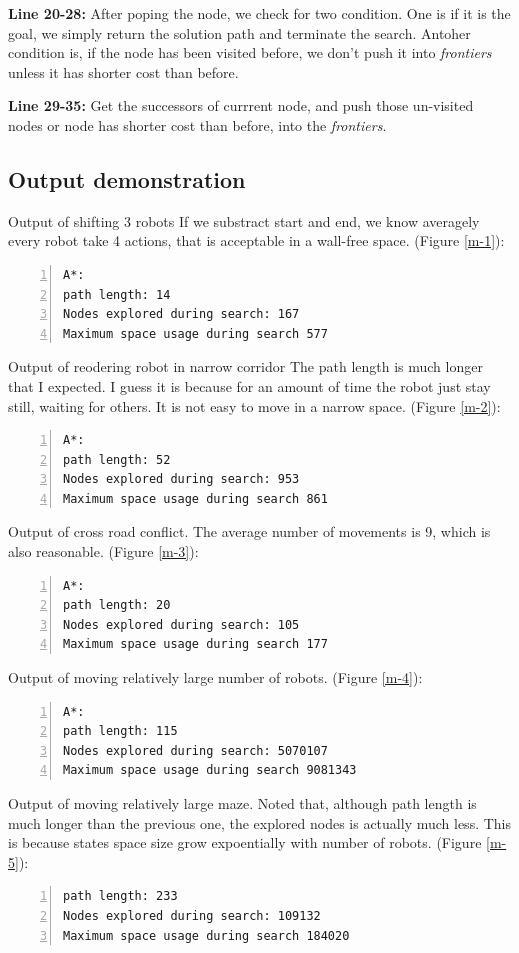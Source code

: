 \documentclass{article}
\begin{document}
\textbf{Line 20-28:} After poping the node, we check for two condition. One is if it is the goal, we simply return the solution path and terminate the search. Antoher condition is, if the node has been visited before, we don't push it into \emph{frontiers} unless it has shorter cost than before.

\textbf{Line 29-35:} Get the successors of currrent node, and push those un-visited nodes or node has shorter cost than before, into the \emph{frontiers}.



\subsection{Output demonstration}

Output of shifting 3 robots If we substract start and end, we know averagely every robot take 4 actions, that is acceptable in a wall-free space. (Figure \ref{m-1}):
\begin{lstlisting}[numbers=left]
A*:
path length: 14
Nodes explored during search: 167
Maximum space usage during search 577
\end{lstlisting}

Output of reodering robot in narrow corridor The path length is much longer that I expected. I guess it is because for an amount of time the robot just stay still, waiting for others. It is not easy to move in a narrow space. (Figure \ref{m-2}):
\begin{lstlisting}[numbers=left]
A*:
path length: 52
Nodes explored during search: 953
Maximum space usage during search 861
\end{lstlisting}


Output of cross road conflict. The average number of movements is 9, which is also reasonable. (Figure \ref{m-3}):
\begin{lstlisting}[numbers=left]
A*:
path length: 20
Nodes explored during search: 105
Maximum space usage during search 177
\end{lstlisting}

Output of moving relatively large number of robots. (Figure \ref{m-4}):
\begin{lstlisting}[numbers=left]
A*:
path length: 115
Nodes explored during search: 5070107
Maximum space usage during search 9081343
\end{lstlisting}

Output of moving relatively large maze. Noted that, although path length is much longer than the previous one, the explored nodes is actually much less. This is because states space size grow expoentially with number of robots. (Figure \ref{m-5}):
\begin{lstlisting}[numbers=left]
path length: 233
Nodes explored during search: 109132
Maximum space usage during search 184020
\end{lstlisting}
\end{document}
